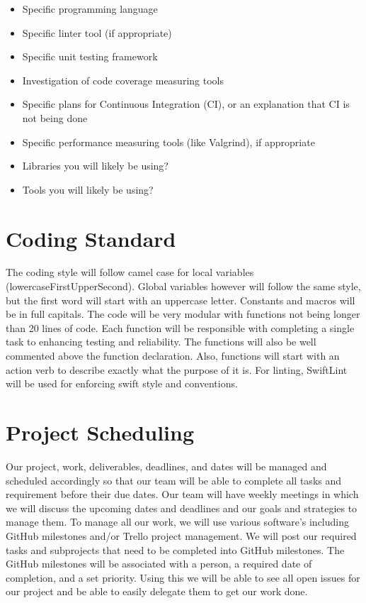 \documentclass{article}
\begin{document}
\begin{itemize}
\item Specific programming language
\item Specific linter tool (if appropriate)
\item Specific unit testing framework
\item Investigation of code coverage measuring tools
\item Specific plans for Continuous Integration (CI), or an explanation that CI
  is not being done
\item Specific performance measuring tools (like Valgrind), if
  appropriate
\item Libraries you will likely be using?
\item Tools you will likely be using?
\end{itemize}

\section{Coding Standard}
	
	The coding style will follow camel case for local variables (lowercaseFirstUpperSecond). Global variables however will follow the same style, but the first word will start with an uppercase letter. Constants and macros will be in full capitals. The code will be very modular with functions not being longer than 20 lines of code. Each function will be responsible with completing a single task to enhancing testing and reliability. The functions will also be well commented above the function declaration. Also, functions will start with an action verb to describe exactly what the purpose of it is. For linting, SwiftLint will be used for enforcing swift style and conventions. 


\section{Project Scheduling}

	Our project, work, deliverables, deadlines, and dates will be managed and scheduled accordingly so that our team will be able to complete all tasks and requirement before their due dates. Our team will have weekly meetings in which we will discuss the upcoming dates and deadlines and our goals and strategies to manage them. To manage all our work, we will use various software’s including GitHub milestones and/or Trello project management. We will post our required tasks and subprojects that need to be completed into GitHub milestones. The GitHub milestones will be associated with a person, a required date of completion, and a set priority. Using this we will be able to see all open issues for our project and be able to easily delegate them to get our work done. 
\end{document}
